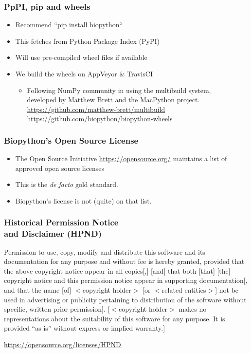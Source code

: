 \begin{frame}
\frametitle{PpPI, pip and wheels}
\begin{itemize}
\item Recommend ``pip install biopython``
\item This fetches from Python Package Index (PyPI)
\item Will use pre-compiled wheel files if available
\item We build the wheels on AppVeyor \& TravisCI
    \begin{itemize}
        \item Following NumPy community in using the multibuild system, \\
              developed by Matthew Brett and the MacPython project. \\
              \url{https://github.com/matthew-brett/multibuild} \\
              \url{https://github.com/biopython/biopython-wheels}
    \end{itemize}
\end{itemize}
\end{frame}


\begin{frame}
\frametitle{Biopython's Open Source License}
\begin{itemize}
\item The Open Source Initiative \url{https://opensource.org/}
    maintains a list of approved open source licenses
\item This is the \textit{de facto} gold standard.
\item Biopython's license is not (quite) on that list.
\end{itemize}
\end{frame}

\begin{frame}
\frametitle{Historical Permission Notice \\ and Disclaimer (HPND)}
Permission to use, copy, modify and distribute this software and its documentation for any purpose and without fee is hereby granted, provided that the above copyright notice appear in all copies[,] [and] that both [that] [the] copyright notice and this permission notice appear in supporting documentation[, and that the name [of] $<$copyright holder$>$ [or $<$related entities$>$] not be used in advertising or publicity pertaining to distribution of the software without specific, written prior permission]. [$<$copyright holder$>$ makes no representations about the suitability of this software for any purpose. It is provided ``as is'' without express or implied warranty.]


\url{https://opensource.org/licenses/HPND}
\end{frame}

